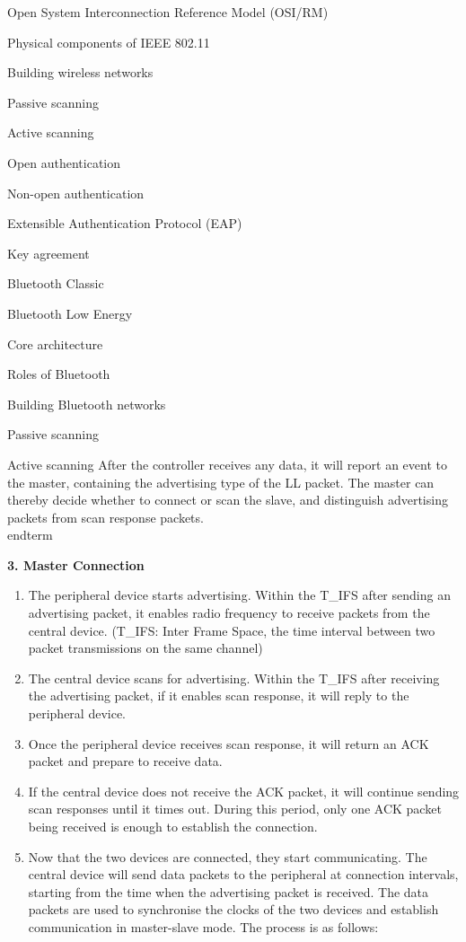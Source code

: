 \documentclass[a4paper,12pt]{book}
\begin{document}
\begin{term}{Open System Interconnection Reference Model (OSI/RM)}
\begin{term}{Physical components of IEEE 802.11}
\begin{term}{Building wireless networks}
\begin{term}{Passive scanning}
\begin{term}{Active scanning}
\begin{term}{Open authentication}
\begin{term}{Non-open authentication}
\begin{term}{Extensible Authentication Protocol (EAP)}
\begin{term}{Key agreement}
\begin{term}{Bluetooth Classic}
\begin{term}{Bluetooth Low Energy}
\begin{term}{Core architecture}
\begin{term}{Roles of Bluetooth}
\begin{term}{Building Bluetooth networks}
\begin{term}{Passive scanning}
\begin{term}{Active scanning}
    \vspace{6pt}
    After the controller receives any data, it will report an event to the master, containing the advertising type of the LL packet. The master can thereby decide whether to connect or scan the slave, and distinguish advertising packets from scan response packets.
\\end{term}{}

\textbf{3. Master Connection}

\begin{enumerate}[label=(\arabic*)]
    \item The peripheral device starts advertising. Within the T\_IFS after sending an advertising packet, it enables radio frequency to receive packets from the central device. (T\_IFS: Inter Frame Space, the time interval between two packet transmissions on the same channel)
    \item The central device scans for advertising. Within the T\_IFS after receiving the advertising packet, if it enables scan response, it will reply to the peripheral device.
    \item Once the peripheral device receives scan response, it will return an ACK packet and prepare to receive data.
    \item If the central device does not receive the ACK packet, it will continue sending scan responses until it times out. During this period, only one ACK packet being received is enough to establish the connection.
    \item Now that the two devices are connected, they start communicating. The central device will send data packets to the peripheral at connection intervals, starting from the time when the advertising packet is received. The data packets are used to synchronise the clocks of the two devices and establish communication in master-slave mode. The process is as follows:


\end{enumerate}
\end{term}
\end{term}
\end{term}
\end{term}
\end{term}
\end{term}
\end{term}
\end{term}
\end{term}
\end{term}
\end{term}
\end{term}
\end{term}
\end{term}
\end{term}
\end{term}
\end{document}
